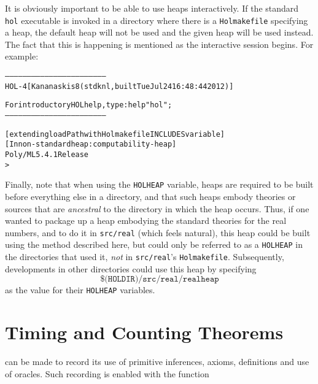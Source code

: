 It is obviously important to be able to use heaps interactively.
If the standard \texttt{hol} executable is invoked in a directory where there is a \texttt{Holmakefile} specifying a heap, the default heap will not be used and the given heap will be used instead.
The fact that this is happening is mentioned as the interactive session begins.
For example:

\begin{samepage}
\begin{alltt}
---------------------------------------------------------------------
       HOL-4 [Kananaskis 8 (stdknl, built Tue Jul 24 16:48:44 2012)]

       For introductory HOL help, type: help "hol";
---------------------------------------------------------------------

[extending loadPath with Holmakefile INCLUDES variable]
[In non-standard heap: computability-heap]
Poly/ML 5.4.1 Release
>
\end{alltt}
\end{samepage}

Finally, note that when using the \texttt{HOLHEAP} variable, heaps are required to be built before everything else in a directory, and that such heaps embody theories or \ML{} sources that are \emph{ancestral} to the directory in which the heap occurs.
Thus, if one wanted to package up a heap embodying the standard theories for the real numbers, and to do it in \texttt{src/real} (which feels natural), this heap could be built using the method described here, but could only be referred to as a \texttt{HOLHEAP} in the directories that used it, \emph{not} in \texttt{src/real}'s \texttt{Holmakefile}.
Subsequently, developments in other directories could use this heap by specifying\[
  \texttt{\$(HOLDIR)/src/real/realheap}
\]
as the value for their \texttt{HOLHEAP} variables.

\section{Timing and Counting Theorems}



\HOL{} can be made to record its use of primitive
inferences, axioms, definitions and use of oracles.  Such recording is
enabled with the function

